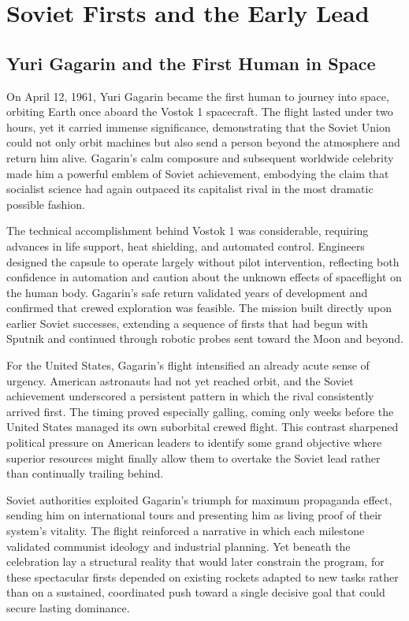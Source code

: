 \section{Soviet Firsts and the Early Lead}

\subsection{Yuri Gagarin and the First Human in Space}
On April 12, 1961, Yuri Gagarin became the first human to journey into space, orbiting Earth once aboard the Vostok 1 spacecraft. The flight lasted under two hours, yet it carried immense significance, demonstrating that the Soviet Union could not only orbit machines but also send a person beyond the atmosphere and return him alive. Gagarin's calm composure and subsequent worldwide celebrity made him a powerful emblem of Soviet achievement, embodying the claim that socialist science had again outpaced its capitalist rival in the most dramatic possible fashion.

The technical accomplishment behind Vostok 1 was considerable, requiring advances in life support, heat shielding, and automated control. Engineers designed the capsule to operate largely without pilot intervention, reflecting both confidence in automation and caution about the unknown effects of spaceflight on the human body. Gagarin's safe return validated years of development and confirmed that crewed exploration was feasible. The mission built directly upon earlier Soviet successes, extending a sequence of firsts that had begun with Sputnik and continued through robotic probes sent toward the Moon and beyond.

For the United States, Gagarin's flight intensified an already acute sense of urgency. American astronauts had not yet reached orbit, and the Soviet achievement underscored a persistent pattern in which the rival consistently arrived first. The timing proved especially galling, coming only weeks before the United States managed its own suborbital crewed flight. This contrast sharpened political pressure on American leaders to identify some grand objective where superior resources might finally allow them to overtake the Soviet lead rather than continually trailing behind.

Soviet authorities exploited Gagarin's triumph for maximum propaganda effect, sending him on international tours and presenting him as living proof of their system's vitality. The flight reinforced a narrative in which each milestone validated communist ideology and industrial planning. Yet beneath the celebration lay a structural reality that would later constrain the program, for these spectacular firsts depended on existing rockets adapted to new tasks rather than on a sustained, coordinated push toward a single decisive goal that could secure lasting dominance.

